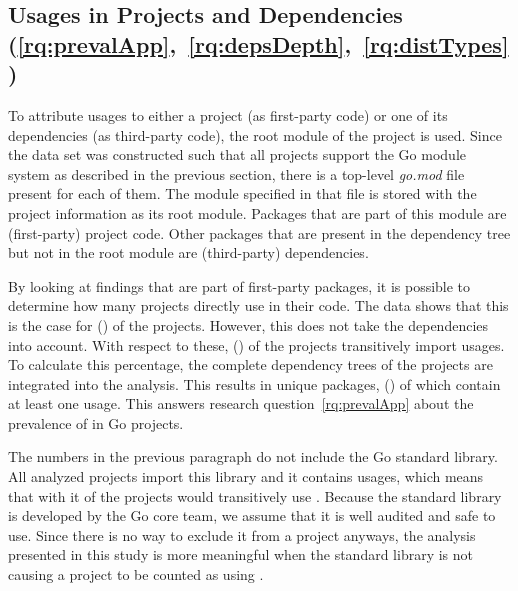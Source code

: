 
\subsection{Usages in Projects and Dependencies (\ref{rq:prevalApp},~\ref{rq:depsDepth},~\ref{rq:distTypes})}\label{subsec:go-geiger:evaluation:unsafe-usage}

To attribute \unsafe{} usages to either a project (as first-party code) or one of its dependencies (as third-party
code), the root module of the project is used.
Since the data set was constructed such that all projects support the Go module system as described in the previous
section, there is a top-level \textit{go.mod} file present for each of them.
The module specified in that file is stored with the project information as its root module.
Packages that are part of this module are (first-party) project code.
Other packages that are present in the dependency tree but not in the root module are (third-party) dependencies.

By looking at \unsafe{} findings that are part of first-party packages, it is possible to determine how many projects
directly use \unsafe{} in their code.
The data shows that this is the case for \unsafeProjects{} (\percentageUnsafeProjects{}) of the \projsAnalyzed{}
projects.
However, this does not take the dependencies into account.
With respect to these, \unsafeTransitiveWithDependencies{} (\percentageUnsafeTransitiveWithDependencies{}) of the
projects transitively import \unsafe{} usages.
To calculate this percentage, the complete dependency trees of the projects are integrated into the analysis.
This results in \packagesAnalyzed{} unique packages, \unsafePackages{} (\percentageUnsafePackages{}) of which contain at
least one \unsafe{} usage.
This answers research question~\ref{rq:prevalApp} about the prevalence of \unsafe{} in Go projects.

The numbers in the previous paragraph do not include the Go standard library.
All analyzed projects import this library and it contains \unsafe{} usages, which means that with it  of
the projects would transitively use \unsafe{}.
Because the standard library is developed by the Go core team, we assume that it is well audited and safe to use.
Since there is no way to exclude it from a project anyways, the analysis presented in this study is more meaningful
when the standard library is not causing a project to be counted as using \unsafe{}.


